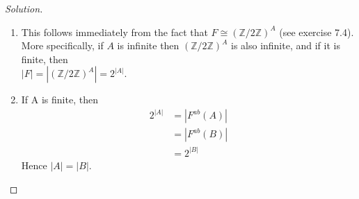 \documentclass[12pt]{article}
\newenvironment{solution}
  {\renewcommand\qedsymbol{$\blacksquare$}\begin{proof}[Solution]}
{\end{proof}}
\begin{document}
\begin{solution}~
  \begin{enumerate}
    \item This follows immediately from the fact that $F\cong (\mathbb{Z}/2\mathbb{Z})^A$ (see exercise 7.4).
      More specifically, if $A$ is infinite then $(\mathbb{Z}/2\mathbb{Z})^A$ is also infinite, and if it is
      finite, then \\$|F| = |(\mathbb{Z}/2\mathbb{Z})^A| = 2^{|A|}$.
    \item If A is finite, then 
      \begin{align*}
      2^{|A|} &= |F^{ab}(A)| \\
      &= |F^{ab}(B)| \\
      &= 2^{|B|}
      \end{align*}
      Hence $|A| = |B|$.
  \end{enumerate} 
\end{solution}
\end{document}
